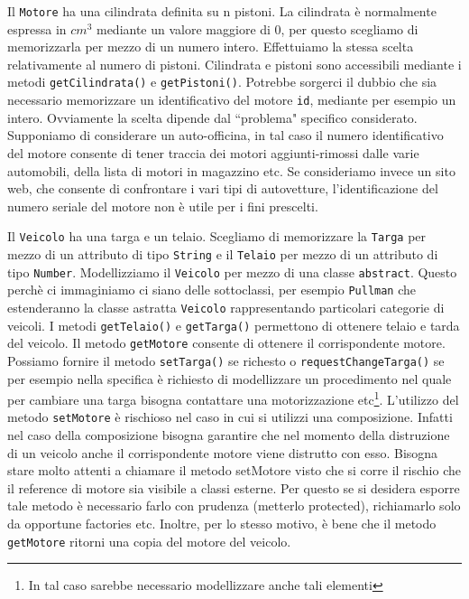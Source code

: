 \documentclass{article}
\begin{document}
Il \texttt{Motore} ha una cilindrata definita su n pistoni. La cilindrata \`e normalmente espressa in $cm^3$ mediante un valore maggiore di $0$, per questo scegliamo di memorizzarla per mezzo di un numero intero. Effettuiamo la stessa scelta relativamente al numero di pistoni. Cilindrata e pistoni sono accessibili mediante i metodi \texttt{getCilindrata()} e \texttt{getPistoni()}. Potrebbe sorgerci il dubbio che sia necessario memorizzare un identificativo del motore \texttt{id}, mediante per esempio un intero. Ovviamente la scelta dipende dal ``problema" specifico considerato. Supponiamo di considerare un auto-officina, in tal caso il numero identificativo del motore consente di tener traccia dei motori aggiunti-rimossi dalle varie automobili, della lista di motori in magazzino etc. Se consideriamo invece un sito web, che consente di confrontare i vari tipi di autovetture, l'identificazione del numero seriale del motore non \`e utile per i fini prescelti.

Il \texttt{Veicolo} ha una targa e un telaio. Scegliamo di memorizzare la \texttt{Targa} per mezzo di un attributo di tipo \texttt{String} e il \texttt{Telaio} per mezzo di un attributo di tipo \texttt{Number}. Modellizziamo il \texttt{Veicolo} per mezzo di una classe \texttt{abstract}. Questo perch\`e ci immaginiamo ci siano delle sottoclassi, per esempio \texttt{Pullman} che estenderanno la classe astratta \texttt{Veicolo} rappresentando particolari categorie di veicoli. I metodi \texttt{getTelaio()} e \texttt{getTarga()} permettono di ottenere telaio e tarda del veicolo. Il metodo \texttt{getMotore} consente di ottenere il corrispondente motore. Possiamo fornire il metodo \texttt{setTarga()} se richesto o \texttt{requestChangeTarga()} se per esempio nella specifica \`e richiesto di modellizzare un procedimento nel quale per cambiare una targa bisogna contattare una motorizzazione etc\footnote{In tal caso sarebbe necessario modellizzare anche tali elementi}. L'utilizzo del metodo \texttt{setMotore}  \`e rischioso nel caso in cui si utilizzi una composizione. Infatti nel caso della composizione bisogna garantire che nel momento della distruzione di un veicolo anche il corrispondente motore viene distrutto con esso. Bisogna stare molto attenti a chiamare il metodo setMotore visto che si corre il rischio che il reference di motore sia visibile a classi esterne. Per questo se si desidera esporre tale metodo  \`e necessario farlo con prudenza (metterlo protected), richiamarlo solo da opportune factories etc. Inoltre, per lo stesso motivo, \`e bene che il metodo \texttt{getMotore} ritorni una copia del motore del veicolo.
\end{document}
